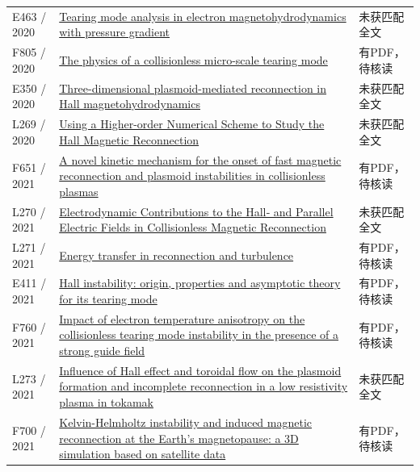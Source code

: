 \begin{longtable}{P{24mm}P{97mm}P{27mm}}
E463 / 2020 & \href{https://doi.org/10.1063/5.0022332}{Tearing mode analysis in electron magnetohydrodynamics with pressure gradient} & 未获匹配全文\\

F805 / 2020 & \href{https://etheses.whiterose.ac.uk/28202/1/Geng_PhD_Thesis.pdf}{The physics of a collisionless micro-scale tearing mode} & 有PDF，待核读\\

E350 / 2020 & \href{http://absimage.aps.org/image/DPP20/MWS_DPP20-2020-001547.pdf}{Three-dimensional plasmoid-mediated reconnection in Hall magnetohydrodynamics} & 未获匹配全文\\

L269 / 2020 & \href{https://doi.org/10.3847/1538-4357/ab7551}{Using a Higher-order Numerical Scheme to Study the Hall Magnetic Reconnection} & 未获匹配全文\\

F651 / 2021 & \href{https://doi.org/10.48550/arxiv.2112.03316}{A novel kinetic mechanism for the onset of fast magnetic reconnection and plasmoid instabilities in collisionless plasmas} & 有PDF，待核读\\

L270 / 2021 & \href{https://doi.org/10.1029/2021ja029550}{Electrodynamic Contributions to the Hall‐ and Parallel Electric Fields in Collisionless Magnetic Reconnection} & 未获匹配全文\\

L271 / 2021 & \href{https://doi.org/10.1103/physreve.104.065206}{Energy transfer in reconnection and turbulence} & 有PDF，待核读\\

E411 / 2021 & \href{https://doi.org/10.1017/s0022377821000726}{Hall instability: origin,  properties and asymptotic theory for its tearing mode} & 有PDF，待核读\\

F760 / 2021 & \href{https://doi.org/10.1063/5.0037227}{Impact of electron temperature anisotropy on the collisionless tearing mode instability in the presence of a strong guide field} & 有PDF，待核读\\

L273 / 2021 & \href{https://doi.org/10.1088/1741-4326/ac3365}{Influence of Hall effect and toroidal flow on the plasmoid formation and incomplete reconnection in a low resistivity plasma in tokamak} & 未获匹配全文\\

F700 / 2021 & \href{https://doi.org/10.1088/1361-6587/ac43f0}{Kelvin-Helmholtz instability and induced magnetic reconnection at the Earth’s magnetopause: a 3D simulation based on satellite data} & 有PDF，待核读\\


\end{longtable}
